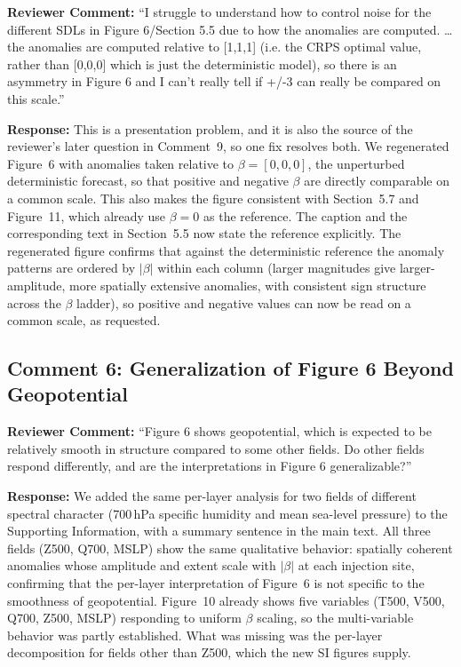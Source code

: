 \documentclass[12pt]{article}
\begin{document}
\textbf{Reviewer Comment:} ``I struggle to understand how to control noise for the
different SDLs in Figure 6/Section 5.5 due to how the anomalies are computed. \ldots{}
the anomalies are computed relative to [1,1,1] (i.e. the CRPS optimal value, rather
than [0,0,0] which is just the deterministic model), so there is an asymmetry in
Figure 6 and I can't really tell if +/-3 can really be compared on this scale.''

\textbf{Response:} This is a presentation problem, and it is also the source
of the reviewer's later question in Comment~9, so one fix resolves both. We
regenerated Figure~6 with anomalies taken relative to $\beta=[0,0,0]$, the unperturbed
deterministic forecast, so that positive and negative $\beta$ are directly comparable
on a common scale. This also makes the figure consistent with Section~5.7 and
Figure~11, which already use $\beta=0$ as the reference. The caption and the
corresponding text in Section~5.5 now state the reference explicitly.
The regenerated figure confirms that against the deterministic reference the anomaly
patterns are ordered by $|\beta|$ within each column (larger magnitudes give
larger-amplitude, more spatially extensive anomalies, with consistent sign structure
across the $\beta$ ladder), so positive and negative values can now be read on a
common scale, as requested.

\subsection*{Comment 6: Generalization of Figure 6 Beyond Geopotential}

\textbf{Reviewer Comment:} ``Figure 6 shows geopotential, which is expected to be
relatively smooth in structure compared to some other fields. Do other fields respond
differently, and are the interpretations in Figure 6 generalizable?''

\textbf{Response:} We added the same per-layer analysis for two fields of
different spectral character (700\,hPa specific humidity and mean sea-level pressure)
to the Supporting Information, with a summary sentence in the main text. All three fields (Z500, Q700,
MSLP) show the same qualitative behavior: spatially coherent anomalies whose
amplitude and extent scale with $|\beta|$ at each injection site, confirming that the
per-layer interpretation of Figure~6 is not specific to the smoothness of
geopotential. Figure~10 already shows five variables (T500, V500, Q700,
Z500, MSLP) responding to uniform $\beta$ scaling, so the multi-variable behavior was
partly established. What was missing was the per-layer decomposition for fields other
than Z500, which the new SI figures supply.
\end{document}
